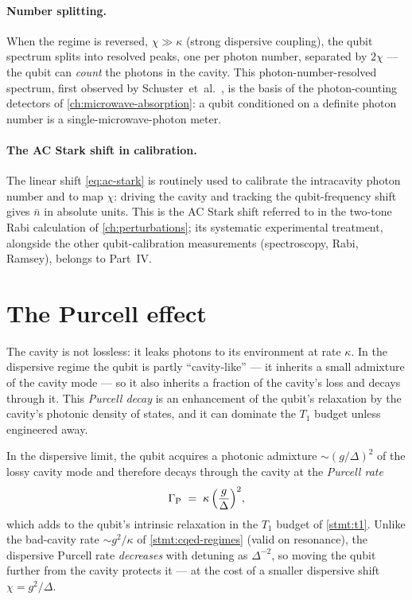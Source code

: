 \paragraph{Number splitting.}
When the regime is reversed, $\chi\gg\kappa$ (strong dispersive
coupling), the qubit spectrum splits into resolved peaks, one per
photon number, separated by $2\chi$ --- the qubit can \emph{count}
the photons in the cavity. This photon-number-resolved spectrum,
first observed by Schuster~et~al.~\cite{schuster2007}, is the basis
of the photon-counting detectors of \cref{ch:microwave-absorption}:
a qubit conditioned on a definite photon number is a
single-microwave-photon meter.

\paragraph{The AC Stark shift in calibration.}
The linear shift \cref{eq:ac-stark} is routinely used to calibrate
the intracavity photon number and to map $\chi$: driving the cavity
and tracking the qubit-frequency shift gives $\bar n$ in absolute
units. This is the AC Stark shift referred to in the two-tone Rabi
calculation of \cref{ch:perturbations}; its systematic experimental
treatment, alongside the other qubit-calibration measurements
(spectroscopy, Rabi, Ramsey), belongs to Part~IV.

\section{The Purcell effect}
\label{sec:purcell}

\begin{phenomenon}
The cavity is not lossless: it leaks photons to its environment at
rate $\kappa$. In the dispersive regime the qubit is partly
``cavity-like'' --- it inherits a small admixture of the cavity
mode --- so it also inherits a fraction of the cavity's loss and
decays through it. This \emph{Purcell decay} is an enhancement of
the qubit's relaxation by the cavity's photonic density of states,
and it can dominate the $T_1$ budget unless engineered away.
\end{phenomenon}

\begin{statement}
\label{stmt:purcell}
In the dispersive limit, the qubit acquires a photonic admixture
$\sim(g/\Delta)^2$ of the lossy cavity mode and therefore decays
through the cavity at the \emph{Purcell rate}
\begin{equation}
\label{eq:purcell-rate}
\Gamma_{\rm P} \;=\; \kappa\,\Bigl(\frac{g}{\Delta}\Bigr)^2,
\end{equation}
which adds to the qubit's intrinsic relaxation in the $T_1$ budget
of \cref{stmt:t1}. Unlike the bad-cavity rate $\sim g^2/\kappa$ of
\cref{stmt:cqed-regimes} (valid on resonance), the dispersive
Purcell rate \emph{decreases} with detuning as $\Delta^{-2}$, so
moving the qubit further from the cavity protects it --- at the cost
of a smaller dispersive shift $\chi=g^2/\Delta$.
\end{statement}

